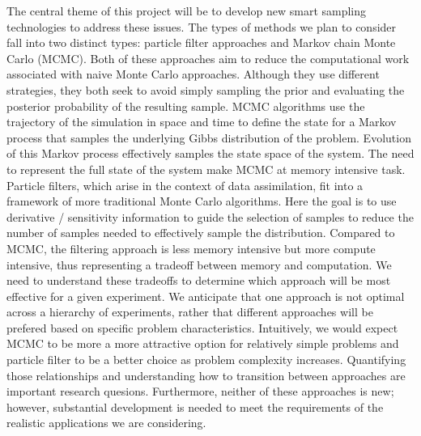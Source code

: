 \documentclass[11pt]{article}
\begin{document}
The central theme of this project will be to develop new smart sampling technologies 
to address these issues.
The types of methods we plan to consider fall into two distinct types:  particle filter approaches
and Markov chain Monte Carlo (MCMC).
Both of these approaches aim to reduce the computational work associated with naive Monte Carlo approaches.
Although they use different strategies, they both seek to avoid simply sampling the prior and evaluating
the posterior probability of the resulting sample. 
MCMC algorithms use the trajectory of the simulation in space and time to define the state for a Markov
process that samples the underlying Gibbs distribution of the problem.  Evolution of this Markov process
effectively samples the state space of the system.  The need to represent the full state of the system
make MCMC at memory intensive task.
Particle filters, which arise in the context of data assimilation,
fit into a framework of more traditional Monte Carlo algorithms.  Here the goal is to use
derivative / sensitivity information to guide the selection of samples to reduce the number of samples
needed to effectively sample the distribution.
Compared to MCMC, the filtering approach is less memory intensive but more compute intensive, thus representing
a tradeoff between memory and computation.
We need to understand these tradeoffs to determine which approach will be most effective for a given
experiment.  We anticipate that one approach is not optimal across a hierarchy of experiments, rather
that different approaches will be prefered based on specific problem characteristics.  Intuitively,
we would expect MCMC to be more a more attractive option for relatively simple problems and particle
filter to be a better choice as problem complexity increases. Quantifying those relationships
and understanding how to transition between approaches are important research quesions.
Furthermore, neither of these approaches is new; however, substantial development is needed to meet the requirements
of the realistic applications we are considering.
\end{document}
